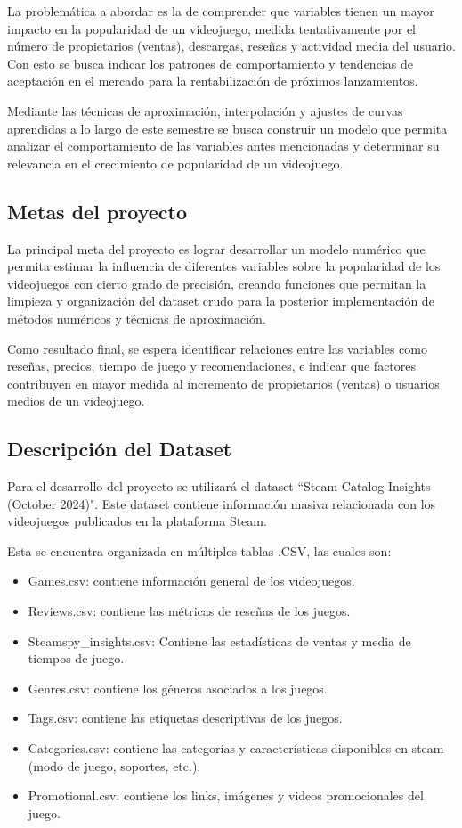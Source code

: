 \documentclass[12pt]{report}
\begin{document}
La problemática a abordar es la de comprender que variables tienen un mayor impacto en la popularidad de un videojuego, medida tentativamente por el número de propietarios (ventas), descargas, reseñas y actividad media del usuario. Con esto se busca indicar los patrones de comportamiento y tendencias de aceptación en el mercado para la rentabilización de próximos lanzamientos.

Mediante las técnicas de aproximación, interpolación y ajustes de curvas aprendidas a lo largo de este semestre se busca construir un modelo que permita analizar el comportamiento de las variables antes mencionadas y determinar su relevancia en el crecimiento de popularidad de un videojuego.

\subsection*{Metas del proyecto}
La principal meta del proyecto es lograr desarrollar un modelo numérico que permita estimar la influencia de diferentes variables sobre la popularidad de los videojuegos con cierto grado de precisión, creando funciones que permitan la limpieza y organización del dataset crudo para la posterior implementación de métodos numéricos y técnicas de aproximación.

Como resultado final, se espera identificar relaciones entre las variables como reseñas, precios, tiempo de juego y recomendaciones, e indicar que factores contribuyen en mayor medida al incremento de propietarios (ventas) o usuarios medios de un videojuego.

\subsection*{Descripción del Dataset}
Para el desarrollo del proyecto se utilizará el dataset “Steam Catalog Insights (October 2024)"\cite{newbie_steam_insights}. Este dataset contiene información masiva relacionada con los videojuegos publicados en la plataforma Steam.

Esta se encuentra organizada en múltiples tablas .CSV, las cuales son:
\begin{itemize}
    \item Games.csv: contiene información general de los videojuegos.
    \item Reviews.csv: contiene las métricas de reseñas de los juegos.
    \item Steamspy\_insights.csv: Contiene las estadísticas de ventas y media de tiempos de juego.
    \item Genres.csv: contiene los géneros asociados a los juegos.
    \item Tags.csv: contiene las etiquetas descriptivas de los juegos.
    \item Categories.csv: contiene las categorías y características disponibles en steam (modo de juego, soportes, etc.).
    \item Promotional.csv: contiene los links, imágenes y videos promocionales del juego.
\end{itemize}
\end{document}
